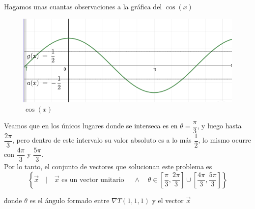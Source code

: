 \documentclass[letterpaper]{article}
\renewcommand{\*}{\cdot}
\theoremstyle{definition}
\begin{document}
Hagamos unas cuantas observaciones a la gráfica del $ \cos(x) $
\begin{figure}[h!]
	\centering
	\includegraphics[width=0.4\linewidth]{img/cosine.png}
	\caption{$ \cos(x) $}
\end{figure}
Veamos que en los únicos lugares donde se interseca es en $ \theta = \dfrac{\pi}{3} $, y luego hasta $ \dfrac{2\pi}{3} $, pero dentro de este intervalo su valor absoluto es a lo más $ \dfrac{1}{2} $, lo mismo ocurre con $ \dfrac{4\pi}{3} $ y $ \dfrac{5\pi}{3}  $.\\

Por lo tanto, el conjunto de vectores que solucionan este problema es 
\[ \left\lbrace \vec{x} \quad | \quad \vec{x} \text{ es un vector unitario } \quad \land \quad \theta \in \left[ \dfrac{\pi}{3}, \dfrac{2\pi}{3} \right] \cup \left[ \dfrac{4\pi}{3}, \dfrac{5\pi}{3} \right]  \right\rbrace \]

donde $ \theta $ es el ángulo formado entre $ \nabla T(1,1,1) $ y el vector $ \vec{x} $

\end{document}
